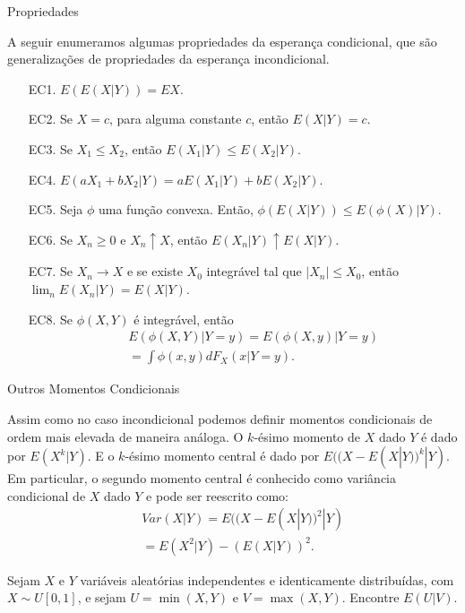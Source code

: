 \begin{frame}
\begin{block}{Propriedades}


A seguir enumeramos algumas propriedades da esperança condicional, que são generalizações de propriedades da esperança incondicional.

\begin{enumerate}
\item[EC1.] $E(E(X|Y))=EX$.

\item[EC2.] Se $X=c$, para alguma constante $c$, então $E(X|Y)=c$.

\item[EC3.] Se $X_1\leq X_2$, então $E(X_1|Y)\leq E(X_2|Y)$.

\item[EC4.] $E(aX_1+bX_2|Y)=aE(X_1|Y)+bE(X_2|Y)$.

\item[EC5.] Seja $\phi$ uma função convexa. Então, $\phi(E(X|Y))\leq E(\phi(X)|Y)$.

\item[EC6.] Se $X_n\geq 0$ e $X_n\uparrow X$, então $E(X_n|Y)\uparrow E(X|Y)$.

\item[EC7.] Se $X_n\rightarrow X$ e se existe $X_0$ integrável tal que $|X_n|\leq X_0$, então $\lim_n E(X_n|Y)=E(X|Y)$.

\item[EC8.] Se $\phi(X,Y)$ é integrável, então
\begin{eqnarray}
& & E(\phi(X,Y)|Y=y)=E(\phi(X,y)|Y=y)\nonumber\\
& & =\int\phi(x,y)dF_X(x|Y=y).\nonumber
\end{eqnarray}
\end{enumerate}

\end{block}
\end{frame}

\begin{frame}{Outros Momentos Condicionais}


Assim como no caso incondicional podemos definir momentos condicionais de ordem mais elevada de maneira análoga. O $k$-ésimo momento de $X$ dado $Y$ é dado por $E(X^k|Y)$. E o $k$-ésimo momento central é dado por $E((X-E(X|Y))^k|Y)$. Em particular, o segundo momento central é conhecido como variância condicional de $X$ dado $Y$ e pode ser reescrito como:
\begin{eqnarray}
& & Var(X|Y)=E((X-E(X|Y))^2|Y)\nonumber\\
& & =E(X^2|Y)-(E(X|Y))^2.
\nonumber
\end{eqnarray}

\begin{exem}
Sejam $X$ e $Y$ variáveis aleatórias independentes e identicamente distribuídas, com $X\sim U[0,1]$, e sejam $U=\min(X,Y)$ e $V=\max(X,Y)$. Encontre $E(U|V)$.
\end{exem}

\end{frame}

